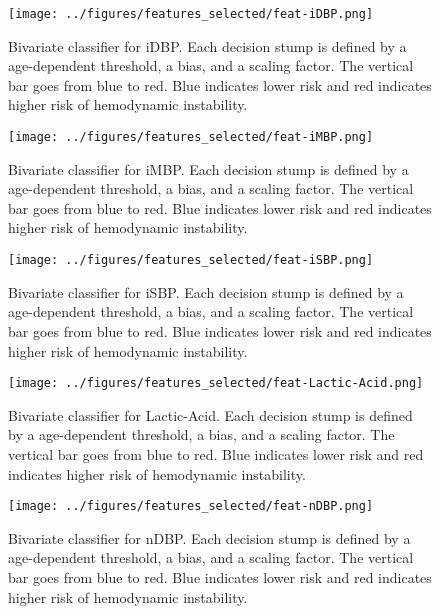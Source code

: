 \documentclass[
   technote
]{phildoc}
\begin{document}
\clearpage

\begin{figure}[h!]
	\centering
	\texttt{[image: ../figures/features\_selected/feat-iDBP.png]}
	\caption{Bivariate classifier for iDBP. Each decision stump is defined by a age-dependent threshold, a bias, and a scaling factor. The vertical bar goes from blue to red. Blue indicates lower risk and red indicates higher risk of hemodynamic instability.}      
\end{figure}

\begin{figure}[h!]
	\centering
	\texttt{[image: ../figures/features\_selected/feat-iMBP.png]}
	\caption{Bivariate classifier for iMBP. Each decision stump is defined by a age-dependent threshold, a bias, and a scaling factor. The vertical bar goes from blue to red. Blue indicates lower risk and red indicates higher risk of hemodynamic instability.}      
\end{figure}

\begin{figure}[h!]
	\centering
	\texttt{[image: ../figures/features\_selected/feat-iSBP.png]}
	\caption{Bivariate classifier for iSBP. Each decision stump is defined by a age-dependent threshold, a bias, and a scaling factor. The vertical bar goes from blue to red. Blue indicates lower risk and red indicates higher risk of hemodynamic instability.}      
\end{figure}

\begin{figure}[h!]
	\centering
	\texttt{[image: ../figures/features\_selected/feat-Lactic-Acid.png]}
	\caption{Bivariate classifier for Lactic-Acid. Each decision stump is defined by a age-dependent threshold, a bias, and a scaling factor. The vertical bar goes from blue to red. Blue indicates lower risk and red indicates higher risk of hemodynamic instability.}      
\end{figure}

\clearpage

\begin{figure}[h!]
	\centering
	\texttt{[image: ../figures/features\_selected/feat-nDBP.png]}
	\caption{Bivariate classifier for nDBP. Each decision stump is defined by a age-dependent threshold, a bias, and a scaling factor. The vertical bar goes from blue to red. Blue indicates lower risk and red indicates higher risk of hemodynamic instability.}      
\end{figure}
\end{document}
